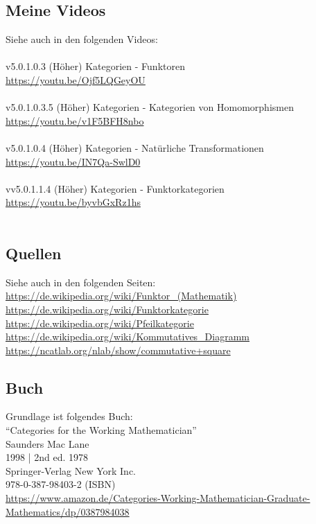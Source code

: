 \documentclass[a4paper]{amsart}
\theoremstyle{definition}
\begin{document}
\subsection*{Meine Videos}
Siehe auch in den folgenden Videos:\\
\\
v5.0.1.0.3 (Höher) Kategorien - Funktoren\\
\url{https://youtu.be/Ojf5LQGeyOU}\\
\\
v5.0.1.0.3.5 (Höher) Kategorien - Kategorien von Homomorphismen\\
\url{https://youtu.be/v1F5BFH8nbo}\\
\\
v5.0.1.0.4 (Höher) Kategorien - Natürliche Transformationen\\
\url{https://youtu.be/IN7Qa-SwlD0}\\
\\
vv5.0.1.1.4 (Höher) Kategorien - Funktorkategorien\\
\url{https://youtu.be/byvbGxRz1hs}\\
\\

\subsection*{Quellen}
Siehe auch in den folgenden Seiten:\\
\url{https://de.wikipedia.org/wiki/Funktor_(Mathematik)}\\
\url{https://de.wikipedia.org/wiki/Funktorkategorie}\\
\url{https://de.wikipedia.org/wiki/Pfeilkategorie}\\
\url{https://de.wikipedia.org/wiki/Kommutatives_Diagramm}\\
\url{https://ncatlab.org/nlab/show/commutative+square}

\subsection*{Buch}
Grundlage ist folgendes Buch:\\
"`Categories for the Working Mathematician"'\\
Saunders Mac Lane\\
1998 | 2nd ed. 1978\\
Springer-Verlag New York Inc.\\
978-0-387-98403-2 (ISBN)\\
{\tiny
   \url{https://www.amazon.de/Categories-Working-Mathematician-Graduate-Mathematics/dp/0387984038}}\\
\end{document}
